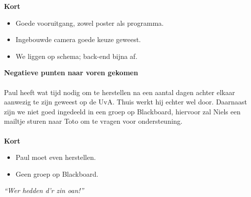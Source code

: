 \documentclass{uva-inf-article}
\begin{document}
\noindent
\textbf{Kort}
\begin{itemize}
\item Goede vooruitgang, zowel poster als programma.
\item Ingebouwde camera goede keuze geweest.
\item We liggen op schema; back-end bijna af.
\end{itemize}

\noindent
\textbf{Negatieve punten naar voren gekomen}\\\\
Paul heeft wat tijd nodig om te herstellen na een aantal dagen achter elkaar aanwezig te zijn geweest op de UvA. Thuis werkt hij echter wel door.
Daarnaast zijn we niet goed ingedeeld in een groep op Blackboard, hiervoor zal Niels een mailtje sturen naar Toto om te vragen voor ondersteuning.
\\\\

\noindent
\textbf{Kort}
\begin{itemize}
\item Paul moet even herstellen.
\item Geen groep op Blackboard.

\end{itemize}

								\vfill	\hfill	\textit{“Wer hedden d’r zin oan!”}

\end{document}
